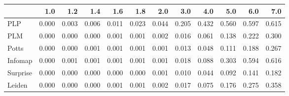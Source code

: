 \begin{tabular}{lrrrrrrrrrrr}
\toprule
{} &   1.0 &   1.2 &   1.4 &   1.6 &   1.8 &   2.0 &   3.0 &   4.0 &   5.0 &   6.0 &   7.0 \\
\midrule
PLP      & 0.000 & 0.003 & 0.006 & 0.011 & 0.023 & 0.044 & 0.205 & 0.432 & 0.560 & 0.597 & 0.615 \\
PLM      & 0.000 & 0.000 & 0.000 & 0.001 & 0.001 & 0.002 & 0.016 & 0.061 & 0.138 & 0.222 & 0.300 \\
Potts    & 0.000 & 0.000 & 0.001 & 0.001 & 0.001 & 0.001 & 0.013 & 0.048 & 0.111 & 0.188 & 0.267 \\
Infomap  & 0.000 & 0.001 & 0.001 & 0.001 & 0.001 & 0.001 & 0.018 & 0.088 & 0.303 & 0.594 & 0.616 \\
Surprise & 0.000 & 0.000 & 0.000 & 0.000 & 0.000 & 0.001 & 0.010 & 0.044 & 0.092 & 0.141 & 0.182 \\
Leiden   & 0.000 & 0.000 & 0.000 & 0.001 & 0.001 & 0.002 & 0.017 & 0.075 & 0.176 & 0.275 & 0.358 \\
\bottomrule
\end{tabular}
